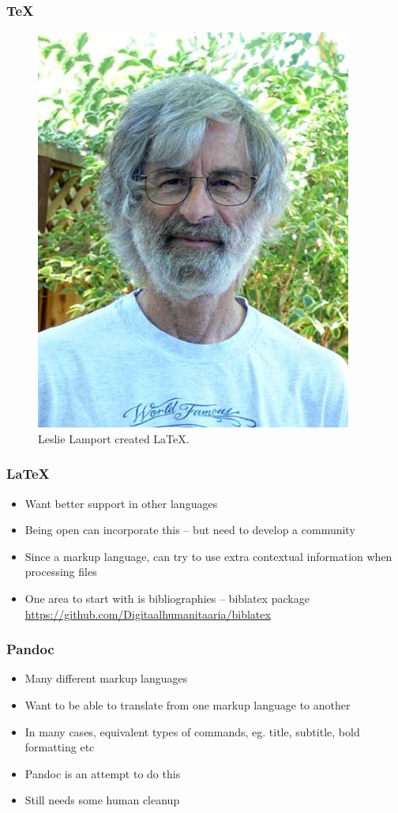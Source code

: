 \documentclass{beamer}
\begin{document}
\begin{frame}
\frametitle{TeX}
\begin{figure}[t]
   \includegraphics[scale = 0.3]{Leslie_Lamport.png}
\caption{Leslie Lamport created LaTeX.}
\end{figure}
\end{frame}

\begin{frame}
\frametitle{LaTeX}
\begin{itemize}
\item Want better support in other languages
\item Being open can incorporate this -- but need to develop a community
\item Since a markup language, can try to use extra contextual information when processing files
\item One area to start with is bibliographies -- biblatex package \url{https://github.com/Digitaalhumanitaaria/biblatex}
\end{itemize}
\end{frame}

\begin{frame}
\frametitle{Pandoc}
\begin{itemize}
\item Many different markup languages
\item Want to be able to translate from one markup language to another
\item In many cases, equivalent types of commands, eg. title, subtitle, bold formatting etc
\item Pandoc is an attempt to do this
\item Still needs some human cleanup
\end{itemize}
\end{frame}
\end{document}
